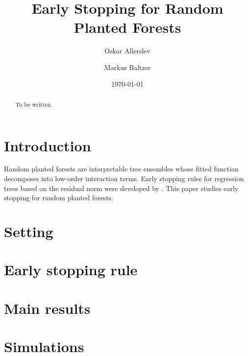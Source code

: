 \documentclass[11pt]{article}
\title{Early Stopping for Random Planted Forests}
\author{Oskar Allerslev \and Markus Baltzer}
\date{\today}
\theoremstyle{definition}
\begin{document}
\maketitle

\begin{abstract}
To be written.
\end{abstract}

\section{Introduction}
Random planted forests \citep{hiabu2023rpf} are interpretable tree ensembles whose
fitted function decomposes into low-order interaction terms. Early stopping rules for
regression trees based on the residual norm were developed by \citet{miftachov2025early}.
This paper studies early stopping for random planted forests.

\section{Setting}

\section{Early stopping rule}

\section{Main results}

\section{Simulations}



\end{document}
